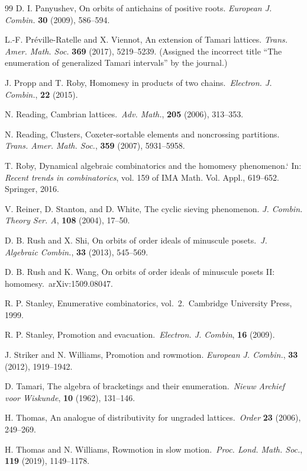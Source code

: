 \documentclass[11pt]{amsart}
\theoremstyle{definition}
\begin{document}
\begin{thebibliography}{99}
D. I. Panyushev, On orbits of antichains of positive roots. \emph{European J.
Combin.} {\bf 30} (2009), 586--594.

L.-F. Pr\'eville-Ratelle and X. Viennot, An extension of Tamari lattices. \emph{Trans. Amer. Math. Soc.} {\bf 369} (2017), 5219--5239. (Assigned the incorrect title ``The enumeration of generalized
Tamari intervals'' by the journal.)

J. Propp and T. Roby, Homomesy in products of two chains.\ \emph{Electron. J. Combin.}, {\bf 22} (2015). 

N. Reading, Cambrian lattices.\ \emph{Adv. Math.}, {\bf 205} (2006), 313--353. 

N. Reading, Clusters, Coxeter-sortable elements and noncrossing partitions. \emph{Trans. Amer. Math. Soc.}, {\bf 359} (2007), 5931--5958.

T. Roby, Dynamical algebraic combinatorics and the homomesy phenomenon.` In: \emph{Recent trends in combinatorics}, vol. 159 of IMA Math. Vol. Appl., 619--652. Springer, 2016. 

V. Reiner, D. Stanton, and D. White, The cyclic sieving phenomenon. \emph{J. Combin. Theory Ser. A}, {\bf 108} (2004), 17--50. 

D. B. Rush and X. Shi, On orbits of order ideals of minuscule posets.\ \emph{J. Algebraic Combin.}, {\bf 33} (2013), 545--569. 

D. B. Rush and K. Wang, On orbits of order ideals of minuscule posets II:
homomesy.\ arXiv:1509.08047.

R. P. Stanley, Enumerative combinatorics, vol.\ 2.\ Cambridge University Press, 1999.

R. P. Stanley, Promotion and evacuation.\ \emph{Electron. J. Combin}, {\bf 16} (2009). 

J. Striker and N. Williams, Promotion and rowmotion. \emph{European J. Combin.}, {\bf 33} (2012), 1919--1942. 

D. Tamari, The algebra of bracketings and their enumeration.\ \emph{Nieuw Archief voor Wiskunde}, {\bf 10} (1962), 131--146.

H. Thomas, An analogue of distributivity for ungraded lattices.\ \emph{Order} {\bf 23} (2006),
249--269.

H. Thomas and N. Williams, Rowmotion in slow motion.\
\emph{Proc. Lond. Math. Soc.}, {\bf 119} (2019), 1149--1178. 
\end{thebibliography}
\end{document}
